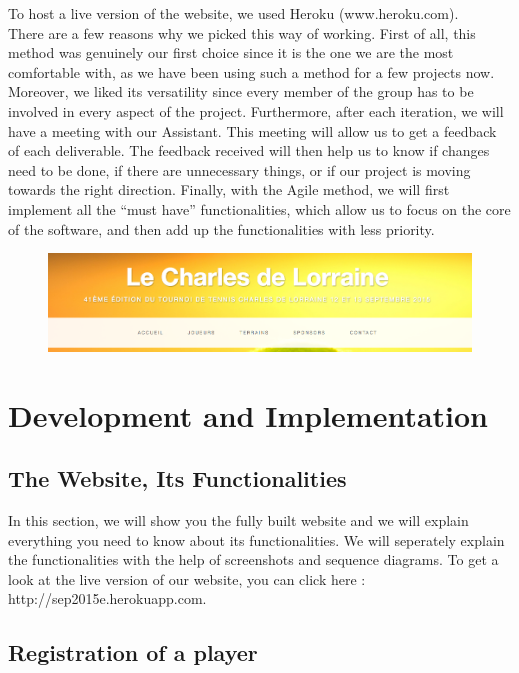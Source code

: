 \documentclass[a4paper, 12pt]{article}
\begin{document}
To host a live version of the website, we used Heroku (www.heroku.com).\\

There are a few reasons why we picked this way of working. First of all, this method was genuinely our first choice since it is the one we are the most comfortable with, as we have been using such a method for a few projects now. Moreover, we liked its versatility since every member of the group has to be involved in every aspect of the project. Furthermore, after each iteration, we will have a meeting with our Assistant. This meeting will allow us to get a feedback of each deliverable. The feedback received will then help us to know if changes need to be done, if there are unnecessary things, or if our project is moving towards the right direction. Finally, with the Agile method, we will first implement all the “must have” functionalities, which allow us to focus on the core of the software, and then add up the functionalities with less priority. \\

\begin{figure}[h]

\includegraphics[scale=0.5]{onglets.png}
\end{figure}
\section{Development and Implementation}
\subsection{The Website, Its Functionalities}

In this section, we will show you the fully built website and we will explain everything you need to know about its functionalities. We will seperately explain the functionalities with the help of screenshots and sequence diagrams. To get a look at the live version of our website, you can click here : http://sep2015e.herokuapp.com. \\



\subsection*{Registration of a player}
\end{document}
